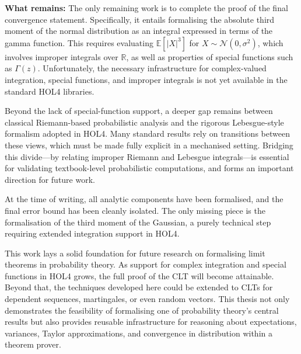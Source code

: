 \textbf{What remains:}
The only remaining work is to complete the proof of the final convergence statement. Specifically, it entails formalising the absolute third moment of the normal distribution as an integral expressed in terms of the gamma function. This requires evaluating \( \mathbb{E}[|X|^3] \) for \( X \sim \mathcal{N}(0, \sigma^2) \), which involves improper integrals over \( \mathbb{R} \), as well as properties of special functions such as \( \Gamma(z) \). Unfortunately, the necessary infrastructure for complex-valued integration, special functions, and improper integrals is not yet available in the standard HOL4 libraries.

Beyond the lack of special-function support, a deeper gap remains between classical Riemann-based probabilistic analysis and the rigorous Lebesgue-style formalism adopted in HOL4. Many standard results rely on transitions between these views, which must be made fully explicit in a mechanised setting. Bridging this divide—by relating improper Riemann and Lebesgue integrals—is essential for validating textbook-level probabilistic computations, and forms an important direction for future work.

At the time of writing, all analytic components have been formalised, and the final error bound has been cleanly isolated. The only missing piece is the formalisation of the third moment of the Gaussian, a purely technical step requiring extended integration support in HOL4.

\medskip

\noindent
This work lays a solid foundation for future research on formalising limit theorems in probability theory. As support for complex integration and special functions in HOL4 grows, the full proof of the CLT will become attainable. Beyond that, the techniques developed here could be extended to CLTs for dependent sequences, martingales, or even random vectors. This thesis not only demonstrates the feasibility of formalising one of probability theory’s central results but also provides reusable infrastructure for reasoning about expectations, variances, Taylor approximations, and convergence in distribution within a theorem prover.

